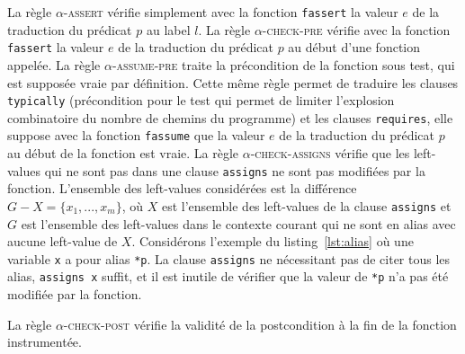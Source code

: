 La règle \textsc{$\alpha$-assert} vérifie simplement avec la fonction
\lstinline'fassert' la valeur $e$ de la traduction du prédicat $p$ au label $l$.
La règle \textsc{$\alpha$-check-pre} vérifie avec la fonction
\lstinline'fassert' la valeur $e$ de la traduction du prédicat $p$ au début
d'une fonction appelée.
La règle \textsc{$\alpha$-assume-pre} traite la précondition de la fonction sous
test, qui est supposée vraie par définition.
Cette même règle permet de traduire les clauses \lstinline'typically'
(précondition pour le test qui permet de limiter l'explosion combinatoire du
nombre de chemins du programme) et les clauses \lstinline'requires', elle
suppose avec la fonction \lstinline'fassume' que la valeur $e$ de la
traduction du prédicat $p$ au début de la fonction est vraie.
La règle \textsc{$\alpha$-check-assigns} vérifie que les left-values qui ne sont
pas dans une clause \lstinline'assigns' ne sont pas modifiées par la fonction.
L'ensemble des left-values considérées est la différence
$G-X = \{x_1, ..., x_m\}$, où  $X$ est l'ensemble des left-values de la clause
\lstinline'assigns' et $G$ est l'ensemble des left-values dans le
contexte courant qui ne sont en alias avec aucune left-value de $X$.
Considérons l'exemple du listing~\ref{lst:alias} où une variable \lstinline'x'
a pour alias \lstinline'*p'.
La clause \lstinline'assigns' ne nécessitant pas de citer tous les alias,
\lstinline'assigns x' suffit, et il est inutile de vérifier que la valeur de
\lstinline'*p' n'a pas été modifiée par la fonction.



La règle \textsc{$\alpha$-check-post} vérifie la validité de la postcondition
à la fin de la fonction instrumentée.

